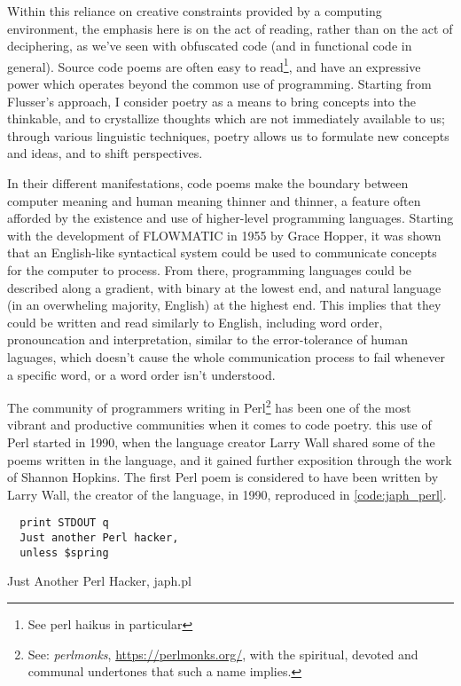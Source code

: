 Within this reliance on creative constraints provided by a computing environment, the emphasis here is on the act of reading, rather than on the act of deciphering, as we've seen with obfuscated code (and in functional code in general). Source code poems are often easy to read\footnote{See perl haikus in particular}, and have an expressive power which operates beyond the common use of programming. Starting from Flusser's approach, I consider poetry as a means to bring concepts into the thinkable, and to crystallize thoughts which are not immediately available to us\cite{flusser_doubt_2014}; through various linguistic techniques, poetry allows us to formulate new concepts and ideas, and to shift perspectives.

In their different manifestations, code poems make the boundary between computer meaning and human meaning thinner and thinner, a feature often afforded by the existence and use of higher-level programming languages. Starting with the development of FLOWMATIC in 1955 by Grace Hopper, it was shown that an English-like syntactical system could be used to communicate concepts for the computer to process. From there, programming languages could be described along a gradient, with binary at the lowest end, and natural language (in an overwheling majority, English) at the highest end. This implies that they could be written and read similarly to English, including word order, pronouncation and interpretation, similar to the error-tolerance of human laguages, which doesn't cause the whole communication process to fail whenever a specific word, or a word order isn't understood.

The community of programmers writing in Perl\footnote{See: \emph{perlmonks}, \url{https://perlmonks.org/}, with the spiritual, devoted and communal undertones that such a name implies.} has been one of the most vibrant and productive communities when it comes to code poetry. this use of Perl started in 1990, when the language creator Larry Wall shared some of the poems written in the language, and it gained further exposition through the work of Shannon Hopkins\cite{hopkins_camels_1992}. The first Perl poem is considered to have been written by Larry Wall, the creator of the language, in 1990, reproduced in \ref{code:japh_perl}.

\begin{listing}
  \begin{verbatim}
  print STDOUT q
  Just another Perl hacker,
  unless $spring
\end{verbatim}
  \caption{Just Another Perl Hacker, japh.pl}
  \label{code:japh_perl}
\end{listing}


